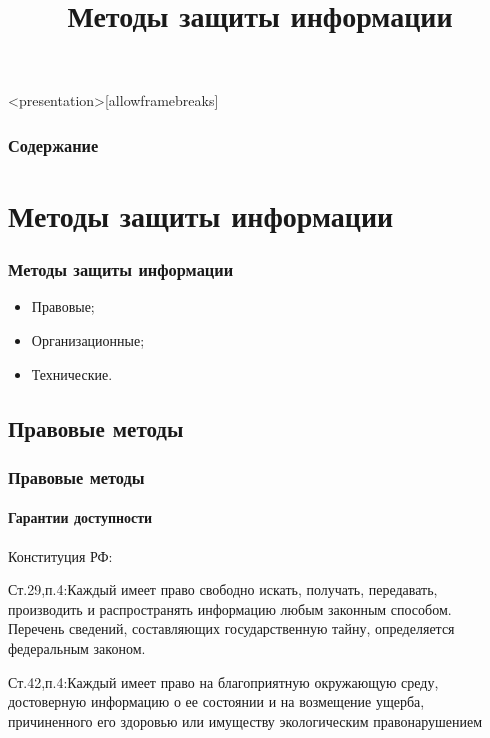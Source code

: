 


\title[Методы защиты информации]{Методы защиты информации}






\begin{frame}<presentation>[allowframebreaks]
\frametitle{Содержание}
\tableofcontents
\end{frame}


\section{Методы защиты информации}

\begin{frame}
\frametitle{Методы защиты информации}
\begin{itemize}
    \item Правовые;
    \item Организационные;
    \item Технические.
\end{itemize}
\end{frame}



\subsection{Правовые методы}


\begin{frame}
\frametitle{Правовые методы}
\framesubtitle{Гарантии доступности}
Конституция РФ:

\alert{Ст.29,п.4:}Каждый имеет право свободно искать, получать, передавать, производить и распространять информацию любым законным способом. Перечень сведений, составляющих государственную тайну, определяется федеральным законом.

\alert{Ст.42,п.4:}Каждый имеет право на благоприятную окружающую среду, достоверную информацию о ее состоянии и на возмещение ущерба, причиненного его здоровью или имуществу экологическим правонарушением
\end{frame}



